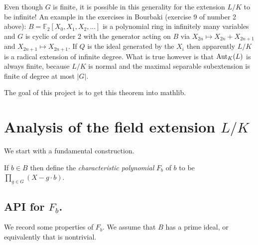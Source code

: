 Even though $G$ is finite, it is possible in this generality for the extension $L/K$ to be infinite!
An example in the exercises in Bourbaki (exercise 9 of number 2 above):
$B=\mathbb{F}_2[X_0,X_1,X_2,\ldots]$
is a polynomial ring in infinitely many variables and $G$ is cyclic of order 2 with
the generator acting on $B$ via $X_{2n}\mapsto X_{2n}+X_{2n+1}$ and $X_{2n+1}\mapsto X_{2n+1}$.
If $Q$ is the ideal generated by the $X_i$ then apparently $L/K$ is a radical extension of
infinite degree. What is true however is that $\operatorname{Aut}_K(L)$ is always finite, because
$L/K$ is normal and the maximal separable subextension is finite of degree at most $|G|$.

The goal of this project is to get this theorem into mathlib.

\section{Analysis of the field extension $L/K$}

We start with a fundamental construction.

\begin{definition}
  \label{MulSemiringAction.CharacteristicPolynomial}
  \leanok
  If $b\in B$ then define the \emph{characteristic polynomial}
  $F_b$ of $b$ to be $\prod_{g\in G}(X-g\cdot b)$.
\end{definition}

\subsection{API for $F_b$.}

We record some properties of $F_b$. We assume that $B$ has a prime ideal, or
equivalently that is nontrivial.

